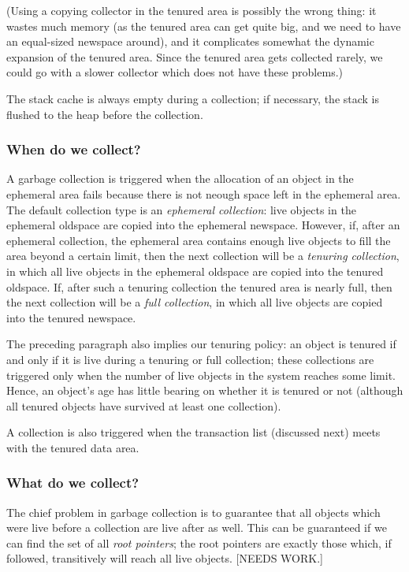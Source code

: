 (Using a copying collector in the tenured area is possibly the wrong thing: it
wastes much memory (as the tenured area can get quite big, and we need to
have an equal-sized newspace around), and it complicates somewhat the dynamic
expansion of the tenured area. Since the tenured area gets collected rarely,
we could go with a slower collector which does not have these problems.)

The stack cache is always empty during a collection; if necessary, the stack
is flushed to the heap before the collection.

\subsubsection{When do we collect?}

A garbage collection is triggered when the allocation of an object in the
ephemeral area fails because there is not neough space left in the ephemeral
area. The default collection type is an {\em ephemeral 
collection}\/:
live objects in the ephemeral oldspace are copied into the ephemeral newspace.
However, if, after an ephemeral collection, the ephemeral area contains
enough live objects to fill the area beyond a certain limit, then the next
collection
will be a {\em tenuring collection}, in which all live objects in the ephemeral
oldspace are copied into the tenured oldspace. If, after such a tenuring 
collection the tenured area is nearly full, then the next collection will be
a {\em full collection}, in which all live objects are copied into the tenured
newspace.

The preceding paragraph also implies our tenuring policy: an object is
tenured if and only if it is live during a tenuring or full collection;
these collections are triggered only when the number of live objects in the
system reaches some limit. Hence, an object's age has little bearing on
whether it is tenured or not (although all tenured objects have survived at
least one collection).

A collection is also triggered when the transaction list (discussed next)
meets with the tenured data area.

\subsubsection{What do we collect?}

The chief problem in garbage collection is to guarantee that all objects
which were live before a collection are live after as well. This can be
guaranteed if we can find the set of all {\em root pointers}; the root
pointers are exactly those which, if followed, transitively will reach all
live objects. [NEEDS WORK.]

